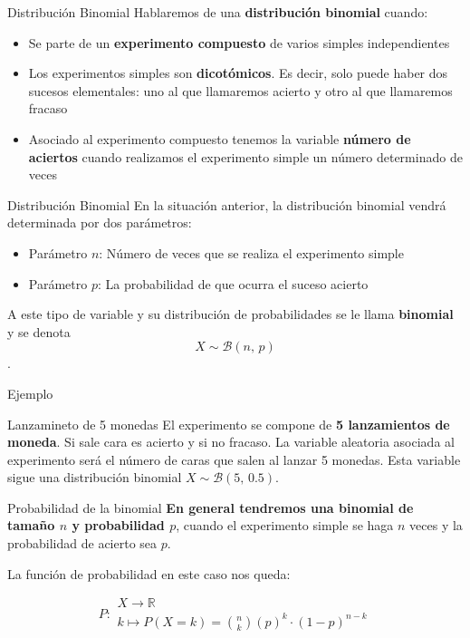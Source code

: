\documentclass[11pt]{beamer}
\begin{document}
\begin{frame}{Distribución Binomial}
Hablaremos de una \textbf{distribución binomial} cuando:
\begin{itemize}[<+->]
\item Se parte de un \textbf{experimento compuesto} de varios simples independientes
\item Los experimentos simples son \textbf{dicotómicos}. Es decir, solo puede haber dos sucesos elementales: uno al que llamaremos acierto y otro al que llamaremos fracaso
\item Asociado al experimento compuesto tenemos la variable \textbf{número de aciertos} cuando realizamos el experimento simple un número determinado de veces
\end{itemize}
\end{frame}

\begin{frame}{Distribución Binomial}
En la situación anterior, la distribución binomial vendrá determinada por dos parámetros:
\begin{itemize}[<+->]
\item Parámetro $n$: Número de veces que se realiza el experimento simple 
\item Parámetro $p$: La probabilidad de que ocurra el suceso acierto
\end{itemize}
\pause

A este tipo de variable y su distribución de probabilidades se le llama \textbf{binomial} y se denota $$X \sim \mathcal{B}(n,\,p)$$.
\end{frame}

\begin{frame}{Ejemplo}
\begin{block}{Lanzamineto de 5 monedas} El experimento se compone de \textbf{5 lanzamientos de moneda}. Si sale cara es acierto y si no fracaso. La variable aleatoria asociada al experimento será el número de caras que salen al lanzar 5 monedas. Esta variable sigue una distribución binomial $X \sim \mathcal{B}(5,\,0.5)$.
\end{block}



\end{frame}

\begin{frame}{Probabilidad de la binomial}
\textbf{En general tendremos una binomial de tamaño $n$ y probabilidad $p$}, cuando el experimento simple se haga $n$ veces y la probabilidad de acierto sea $p$.

La función de probabilidad en este caso nos queda:

\begin{block}{}
 $$P\colon \begin{array}{l} 
          X \rightarrow \mathbb{R} \\ 
          k\mapsto P(X=k)=\binom{n}{k}\left(p\right)^k\cdot  \left(1-p\right)^{n-k} 
         \end{array}$$

\end{block} 
    
\end{frame}
\end{document}
